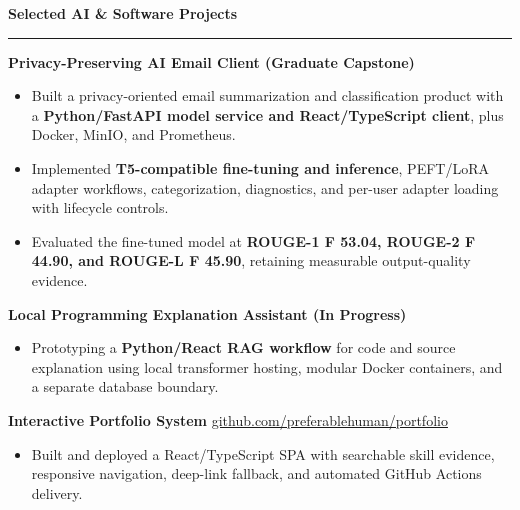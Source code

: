 \documentclass[11pt,letterpaper]{article}
\newcommand{\ressection}[1]{\Needspace{6\baselineskip}\vspace{8pt}\par\textbf{#1}\par\vspace{2pt}\hrule\vspace{5pt}}
\begin{document}
\ressection{Selected AI \& Software Projects}
\textbf{Privacy-Preserving AI Email Client (Graduate Capstone)}
\begin{itemize}
  \item Built a privacy-oriented email summarization and classification product with a \textbf{Python/FastAPI model service and React/TypeScript client}, plus Docker, MinIO, and Prometheus.
  \item Implemented \textbf{T5-compatible fine-tuning and inference}, PEFT/LoRA adapter workflows, categorization, diagnostics, and per-user adapter loading with lifecycle controls.
  \item Evaluated the fine-tuned model at \textbf{ROUGE-1 F 53.04, ROUGE-2 F 44.90, and ROUGE-L F 45.90}, retaining measurable output-quality evidence.
\end{itemize}
\vspace{2pt}
\textbf{Local Programming Explanation Assistant (In Progress)}
\begin{itemize}
  \item Prototyping a \textbf{Python/React RAG workflow} for code and source explanation using local transformer hosting, modular Docker containers, and a separate database boundary.
\end{itemize}
\vspace{2pt}
\textbf{Interactive Portfolio System} \hfill \href{https://github.com/preferablehuman/portfolio}{github.com/preferablehuman/portfolio}
\begin{itemize}
  \item Built and deployed a React/TypeScript SPA with searchable skill evidence, responsive navigation, deep-link fallback, and automated GitHub Actions delivery.
\end{itemize}
\end{document}
